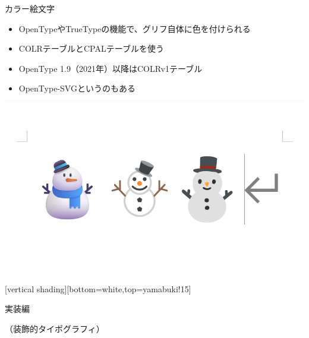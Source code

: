 \documentclass[unicode,14pt]{beamer}
\begin{document}
\begin{frame}[t]{カラー絵文字}
  \sffamily
  \begin{itemize}
\item OpenTypeやTrueTypeの機能で、グリフ自体に色を付けられる
\item COLRテーブルとCPALテーブルを使う
\item OpenType 1.9（2021年）以降はCOLRv1テーブル
\item OpenType-SVGというのもある
  \end{itemize}
  \begin{center}
    \includegraphics[width=.5\textwidth]{figures/emoji.png}
  \end{center}
\end{frame}

[vertical shading][bottom=white,top=yamabuki!15]

\begin{frame}[plain]
  \begin{center}
    \color{black}
    実装編\par
    \color{50gray}
    （装飾的タイポグラフィ）
  \end{center}
\end{frame}
\end{document}
